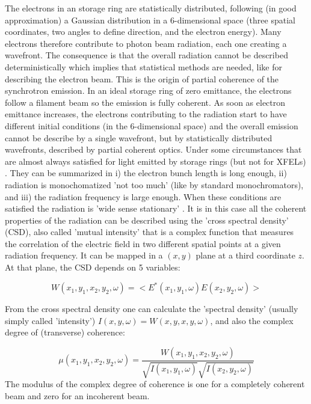 \documentclass{iucr}              %
\begin{document}
The electrons in an storage ring are statistically distributed, following (in good approximation) a Gaussian distribution in a 6-dimensional space (three spatial coordinates, two angles to define direction, and the electron energy). Many electrons therefore contribute to photon beam radiation, each one creating a wavefront. The consequence is that the overall radiation cannot be described deterministically which implies that statistical methods are needed, like for describing the electron beam. This is the origin of partial coherence of the synchrotron emission. In an ideal storage ring of zero emittance, the electrons follow a filament beam so the emission is fully coherent. As soon as  electron emittance increases, the electrons contributing to the radiation start to have different initial conditions (in the 6-dimensional space) and the overall emission cannot be describe by a single wavefront, but by statistically distributed wavefronts, described by partial coherent optics. Under some circumstances that are almost always satisfied for light emitted by storage rings (but not for XFELs) \cite{geloni2008}. They can be summarized in i) the electron bunch length is long enough, ii) radiation is monochomatized 'not too much' (like by standard monochromators), and iii) the radiation frequency is large enough. When these conditions are satisfied the radiation is 'wide sense stationary' \cite{mandel_wolf}. It is in this case all the coherent properties of the radiation can be described using the 'cross spectral density' (CSD), also called 'mutual intensity' that is a complex function that measures the correlation of the electric field in two different spatial points at a given radiation frequency. It can be mapped in a $(x,y)$ plane at a third coordinate $z$. At that plane, the CSD depends on 5 variables: 

\begin{equation}
W(x_1,y_1,x_2,y_2,\omega) = <E^*(x_1,y_1,\omega) E(x_2,y_2,\omega)>
\label{CSD}
\end{equation}

From the cross spectral density one can calculate the 'spectral density' (usually simply called 'intensity') $I(x,y,\omega)=W(x,y,x,y,\omega)$, and also the complex degree of (transverse) coherence: 

\begin{equation}
\mu(x_1,y_1,x_2,y_2,\omega) = \frac{W(x_1,y_1,x_2,y_2,\omega)}{\sqrt{I(x_1,y_1,\omega)}\sqrt{I(x_2,y_2,\omega)}}
\label{DTC}
\end{equation}
The modulus of the complex degree of coherence is one for a completely coherent beam and zero for an incoherent beam. 
\end{document}

